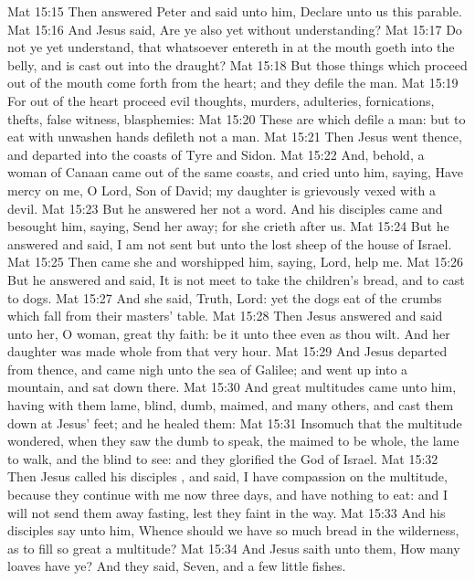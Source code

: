 \vs Mat 15:15 Then answered Peter and said unto him, Declare unto us this parable.
\vs Mat 15:16 And Jesus said, Are ye also yet without understanding?
\vs Mat 15:17 Do not ye yet understand, that whatsoever entereth in at the mouth goeth into the belly, and is cast out into the draught?
\vs Mat 15:18 But those things which proceed out of the mouth come forth from the heart; and they defile the man.
\vs Mat 15:19 For out of the heart proceed evil thoughts, murders, adulteries, fornications, thefts, false witness, blasphemies:
\vs Mat 15:20 These are  which defile a man: but to eat with unwashen hands defileth not a man.
\vs Mat 15:21 Then Jesus went thence, and departed into the coasts of Tyre and Sidon.
\vs Mat 15:22 And, behold, a woman of Canaan came out of the same coasts, and cried unto him, saying, Have mercy on me, O Lord,  Son of David; my daughter is grievously vexed with a devil.
\vs Mat 15:23 But he answered her not a word. And his disciples came and besought him, saying, Send her away; for she crieth after us.
\vs Mat 15:24 But he answered and said, I am not sent but unto the lost sheep of the house of Israel.
\vs Mat 15:25 Then came she and worshipped him, saying, Lord, help me.
\vs Mat 15:26 But he answered and said, It is not meet to take the children's bread, and to cast  to dogs.
\vs Mat 15:27 And she said, Truth, Lord: yet the dogs eat of the crumbs which fall from their masters' table.
\vs Mat 15:28 Then Jesus answered and said unto her, O woman, great  thy faith: be it unto thee even as thou wilt. And her daughter was made whole from that very hour.
\vs Mat 15:29 And Jesus departed from thence, and came nigh unto the sea of Galilee; and went up into a mountain, and sat down there.
\vs Mat 15:30 And great multitudes came unto him, having with them  lame, blind, dumb, maimed, and many others, and cast them down at Jesus' feet; and he healed them:
\vs Mat 15:31 Insomuch that the multitude wondered, when they saw the dumb to speak, the maimed to be whole, the lame to walk, and the blind to see: and they glorified the God of Israel.
\vs Mat 15:32 Then Jesus called his disciples , and said, I have compassion on the multitude, because they continue with me now three days, and have nothing to eat: and I will not send them away fasting, lest they faint in the way.
\vs Mat 15:33 And his disciples say unto him, Whence should we have so much bread in the wilderness, as to fill so great a multitude?
\vs Mat 15:34 And Jesus saith unto them, How many loaves have ye? And they said, Seven, and a few little fishes.
